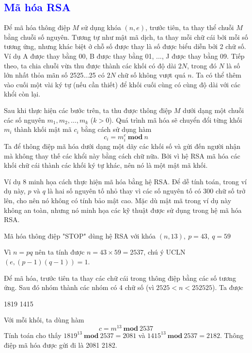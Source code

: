 \textcolor{blue}{\section{Mã hóa RSA}}
Để mã hóa thông điệp $M$ sử dụng khóa $(n,e)$, trước tiên, ta thay thể chuỗi $M$ bằng chuỗi số nguyên.
Tương tự như mật mã dịch, ta thay mỗi chữ cái bởi mỗi số tương ứng, nhưng khác biệt ở chỗ số được thay là số được biểu diễn bởi 2 chữ số.
Ví dụ A được thay bằng 00, B được thay bằng 01, ..., J được thay bằng 09.
Tiếp theo, ta chia chuỗi vừa thu được thành các khối có độ dài $2N$, trong đó $N$ là số lớn nhất thỏa mãn số 2525...25 có $2N$ chữ số không vượt quá $n$. Ta có thể thêm vào cuối một vài ký tự (nếu cần thiết) để khối cuối cùng có cùng độ dài với các khổi còn lại.

Sau khi thực hiện các bước trên, ta thu được thông điệp $M$ dưới dạng một chuỗi các số nguyên $m_1, m_2, \ldots, m_k$ ($k>0$).
Quá trình mã hóa sẽ chuyển đổi từng khối $m_i$ thành khối mật mã $c_i$ bằng cách sử dụng hàm
$$ c_i = m_i^e\ \mathbf{mod}\ n$$
Ta để thông điệp mã hóa dưới dạng một dãy các khối số và gửi đến
người nhận mà không thay thế các khổi này bằng cách chữ nữa. Bởi vì hệ RSA mã hóa các khối chữ cái thành các
khối ký tự khác, nên nó là một mật mã khối.

Ví dụ 8 minh họa cách thực hiện mã hóa bằng hệ RSA. Để dễ tính toán, trong ví dụ này, $p$ và $q$ là hai số nguyên tố nhỏ thay vì các số nguyên tố có
300 chữ số trở lên, cho nên nó không có tính bảo mật cao.
Mặc dù mật mã trong ví dụ này không an toàn,
nhưng nó minh họa các kỹ thuật được sử dụng trong hệ mã hóa RSA.
\begin{example}
    Mã hóa thông điệp "STOP" dùng hệ RSA với khóa $(n,13),\ p =43,\ q =59$
\end{example}
\begin{solution}
    Vì $n = pq$ nên ta tính được $n=43\times59 = 2537$, chú ý UCLN$(e,(p-1)(q-1)) = 1$.

    Để mã hóa, trước tiên ta thay các chữ cái trong thông điệp bằng các số tương ứng. Sau đó nhóm thành các nhóm có 4 chữ số (vì $2525 < n < 252525$). Ta được
    \begin{center}
        1819 \hspace{0.5cm} 1415
    \end{center}
    Với mỗi khối, ta dùng hàm
    $$ c = m^{13}\ \mathbf{mod}\ 2537$$
    Tính toán cho thấy $1819^{13}\ \mathbf{mod}\ 2537 = 2081$ và $1415^{13}\ \mathbf{mod}\ 2537 = 2182$.
    Thông điệp mã hóa được gửi đi là 2081 2182.
\end{solution}